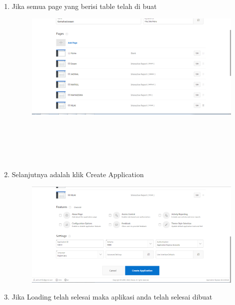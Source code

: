 \documentclass[12pt, times new roman, a4paper]{article}
\begin{document}
\begin{enumerate}
\item Jika semua page yang berisi table telah di buat
\begin{figure} [h]
	\centering
		\includegraphics[scale=0.4]{gambar/18}
\end{figure}
\\
\\
\\
\\
\item Selanjutnya adalah klik Create Application
\begin{figure} [h]
	\centering
		\includegraphics[scale=0.4]{gambar/19}
\end{figure}

\item Jika Loading telah selesai maka aplikasi anda telah selesai dibuat


\end{enumerate}
\end{document}
